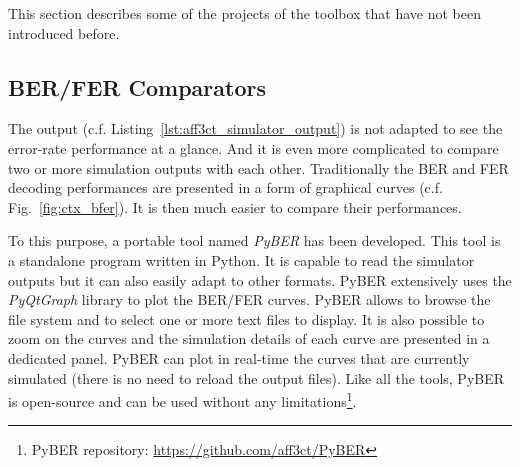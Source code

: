 This section describes some of the projects of the \AFFECT toolbox that have
not been introduced before.

\subsection{BER/FER Comparators}

The \AFFECT output (c.f. Listing~\ref{lst:aff3ct_simulator_output}) is not
adapted to see the error-rate performance at a glance. And it is even more
complicated to compare two or more simulation outputs with each other.
Traditionally the BER and FER decoding performances are presented in a form of
graphical curves (c.f. Fig.~\ref{fig:ctx_bfer}). It is then much easier to
compare their performances.

To this purpose, a portable tool named \emph{PyBER} has been developed.
This tool is a standalone program written in Python. It is capable to read the
\AFFECT simulator outputs but it can also easily adapt to other formats. PyBER
extensively uses the \emph{PyQtGraph} library to plot the BER/FER curves. PyBER
allows to browse the file system and to select one or more text files to
display. It is also possible to zoom on the curves and the simulation details of
each curve are presented in a dedicated panel. PyBER can plot in real-time the
curves that are currently simulated (there is no need to reload the \AFFECT
output files). Like all the \AFFECT tools, PyBER is open-source and can be used
without any limitations\footnote{PyBER repository:
\url{https://github.com/aff3ct/PyBER}}.

